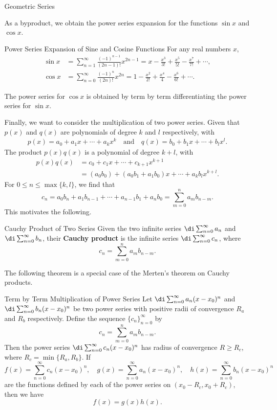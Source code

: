 \begin{example}[label=230305_16]{Geometric Series}
\begin{example}[label=230304_9]{}
\begin{example}{}
As a byproduct, we obtain the power series expansion for the functions $\sin x$ and $\cos x$.
\begin{theorem}{Power Series Expansion of Sine and Cosine Functions}
For any real numbers $x$,
\begin{align*}\sin x&=\sum_{n=1}^{\infty} \frac{(-1)^{n-1}}{(2n-1)!}x^{2n-1}=x-\frac{x^3}{3!}+\frac{x^5}{5!}-\frac{x^7}{7!}+\cdots,\\
\cos x&=\sum_{n=0}^{\infty} \frac{(-1)^{n}}{(2n)!}x^{2n}=1-\frac{x^2}{2!}+\frac{x^4}{4}-\frac{x^6}{6!}+\cdots.\end{align*}
\end{theorem}The power series for $\cos x$ is obtained by term by term differentiating the power series for $\sin x$. 

Finally, we want to consider the multiplication of two power series. Given that $p(x)$ and $q(x)$ are polynomials of degree $k$ and $l$ respectively,   with
\begin{align*}
p(x)=a_0+a_1x+\cdots+a_kx^k\quad\text{and}\quad q(x)=b_0+b_1x+\cdots+b_lx^l.
\end{align*}The product $p(x)q(x)$ is a polynomial of degree $k+l$, with
\begin{align*}p(x)q(x)&=c_0+c_1x+\cdots+c_{k+1}x^{k+1}\\
&=(a_0b_0)+(a_0b_1+a_1b_0)x+\cdots  +a_kb_lx^{k+l}.\end{align*}For $0\leq n\leq \max\{k, l\}$, we find that
\[c_n=a_0b_n+a_1b_{n-1}+\cdots+a_{n-1}b_1+a_nb_0=\sum_{m=0}^{n}a_{m}b_{n-m}.\]This motivates the following.
\begin{definition}{Cauchy Product of Two Series}
Given the two infinite series $\di\sum_{n=0}^{\infty}a_n$ and $\di\sum_{n=0}^{\infty}b_n$, their {\bf Cauchy product} is the infinite series $\di\sum_{n=0}^{\infty}c_n$, where
\[c_n=\sum_{m=0}^{n}a_{m}b_{n-m}.\]
\end{definition}The following theorem is a special case of the Merten's theorem on Cauchy products.  
\begin{theorem}[label=230306_2]{Term by Term Multiplication of Power Series}
Let $\di\sum_{n=0}^{\infty}a_n(x-x_0)^n$ and $\di\sum_{n=0}^{\infty}b_n(x-x_0)^n$ be two power series with positive radii of convergence $R_a$ and $R_b$ respectively. Define the sequence $\{c_n\}_{n=0}^{\infty}$ by
\[c_n=\sum_{m=0}^n a_mb_{n-m}.\]Then the power series  $\di\sum_{n=0}^{\infty}c_n(x-x_0)^n$ has radius of convergence $R\geq R_c$, where $R_c= \min\{R_a, R_b\}$. If
\[f(x)=\sum_{n=0}^{\infty}c_n(x-x_0)^n,\quad g(x)=\sum_{n=0}^{\infty}a_n(x-x_0)^n,\quad h(x)=\sum_{n=0}^{\infty}b_n(x-x_0)^n \]are the functions defined by each of the power series on $(x_0-R_c, x_0+R_c)$, then
 we have
\[f(x)=g(x)h(x).\]
 


\end{theorem}
\end{example}
\end{example}
\end{example}
